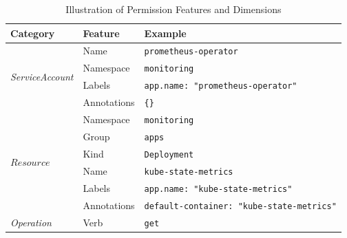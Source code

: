 \documentclass[conference]{IEEEtran}
\theoremstyle{definition}
\newtheorem{definition}{Definition}
\begin{document}

\begin{table}[!ht]
    \centering
    \caption{Illustration of Permission Features and Dimensions}
    \label{tab:features}
    \renewcommand{\arraystretch}{1.2} %
    \setlength{\tabcolsep}{0.5mm} %
    \begin{tabular}{p{2cm}p{2cm}p{4cm}}
    \toprule
    \textbf{Category} & \textbf{Feature} & \textbf{Example} \\ 
    \hline
    \multirow{4}{*}{\textit{ServiceAccount}} & Name & \texttt{prometheus-operator} \\ 
                                    & Namespace & \texttt{monitoring} \\ 
                                    & Labels & \texttt{app.name:
                                    "prometheus-operator"} \\ 
                                    & Annotations & \texttt{\{\}} \\ 
    \hline
    \multirow{6}{*}{$Resource$}       & Namespace & \texttt{monitoring} \\ 
                                    & Group & \texttt{apps} \\ 
                                    & Kind & \texttt{Deployment} \\ 
                                    & Name & \texttt{kube-state-metrics} \\ 
                                    & Labels & \texttt{app.name: "kube-state-metrics"} \\ 
                                    & Annotations & \texttt{default-container: "kube-state-metrics"} \\ 
    \hline
    \textit{Operation} & Verb & \texttt{get} \\ 
    \bottomrule
    \end{tabular}
\end{table}
\end{document}
